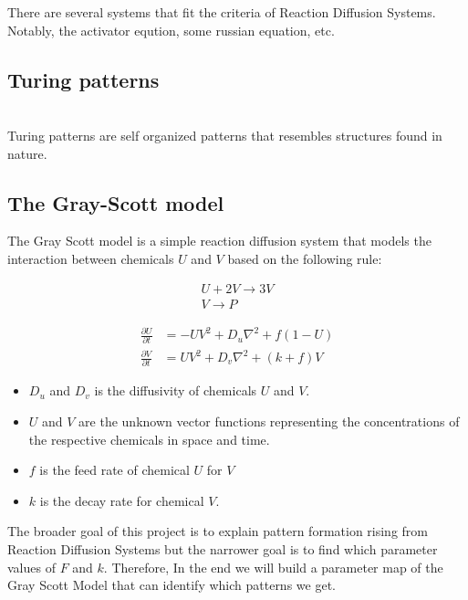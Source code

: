 \documentclass[a4paper, 11pt]{article}
\begin{document}
There are several systems that fit the criteria of Reaction Diffusion Systems. Notably, the activator eqution, some russian equation, etc.


\subsection{Turing patterns}
\label{sec:turing-patterns}
 \\
Turing patterns are self organized patterns that resembles structures found in nature. \\


\subsection{The Gray-Scott model}
\label{sec:gray-scott}

The Gray Scott model is a simple reaction diffusion system that models the interaction between chemicals $U$ and $V$ based on the following rule:

\begin{align*}
	U + 2V \to 3V \\
	V \to P
\end{align*}


\begin{align*}
	\frac{\partial U}{\partial t} & = -UV^2 + D_u \nabla^2 + f(1 - U) \\
	\frac{\partial V}{\partial t} & = UV^2 + D_v \nabla^2 + (k + f)V
\end{align*}
\begin{itemize}
	\item $D_u$ and $D_v$ is the diffusivity of chemicals $U$ and $V$.
	\item $U$ and $V$ are the unknown vector functions representing the concentrations of the respective chemicals in space and time.
	\item $f$ is the feed rate of chemical $U$ for $V$
	\item $k$ is the decay rate for chemical $V$.
\end{itemize}

The broader goal of this project is to explain pattern formation rising from Reaction Diffusion Systems but the narrower goal is to find which parameter values of $F$ and $k$. Therefore, In the end we will build a parameter map of the Gray Scott Model that can identify which patterns we get.
\end{document}
